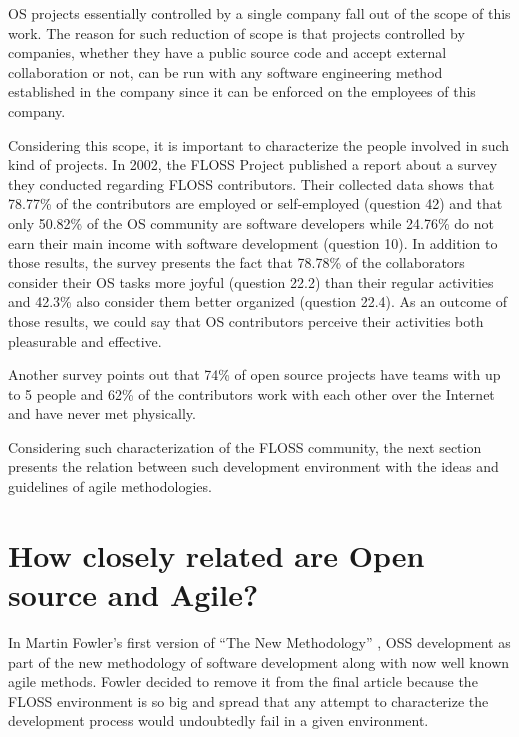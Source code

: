 \documentclass[lnbip]{svmultln}
\begin{document}
OS projects essentially controlled by a single company fall out of the
scope of this work. The reason for such reduction of scope is that
projects controlled by companies, whether they have a public source
code and accept external collaboration or not, can be run with any
software engineering method established in the company since it can be
enforced on the employees of this company.

Considering this scope, it is important to characterize the people
involved in such kind of projects. In 2002, the FLOSS Project
\cite{url:flossproject} published a report about a survey they
conducted regarding FLOSS contributors. Their collected data
\cite{url:flossdata} shows that 78.77\% of the contributors are
employed or self-employed (question 42) and that only 50.82\% of the
OS community are software developers while 24.76\% do not earn their
main income with software development (question 10).  In addition to
those results, the survey presents the fact that 78.78\% of the
collaborators consider their OS tasks more joyful (question 22.2) than
their regular activities and 42.3\% also consider them better
organized (question 22.4). As an outcome of those results, we could
say that OS contributors perceive their activities both pleasurable
and effective.


Another survey \cite{reis2003} points out that 74\% of open source
projects have teams with up to 5 people and 62\% of the contributors
work with each other over the Internet and have never met physically.

Considering such characterization of the FLOSS community, the next
section presents the relation between such development environment
with the ideas and guidelines of agile methodologies.

\section{How closely related are Open source and Agile?}
\label{sec:relation}

In Martin Fowler's first version of ``The New Methodology''
\cite{url:fowler2000orig}, OSS development as part of the new
methodology of software development along with now well known agile
methods. Fowler decided to remove it from the final article because
the FLOSS environment is so big and spread that any attempt to
characterize the development process would undoubtedly fail in a given
environment.
\end{document}
